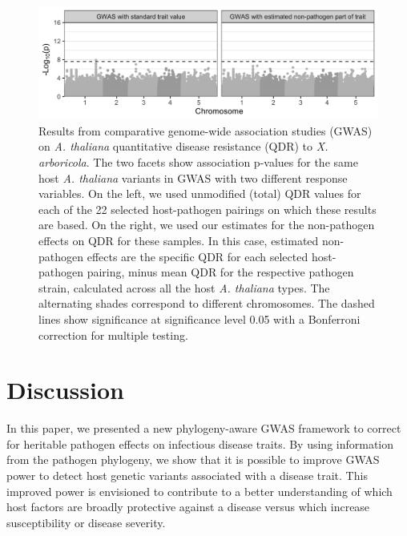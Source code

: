 \documentclass[11pt]{article}
\begin{document}
\begin{linenumbers}
\begin{figure}[H]
\begin{center}
    \includegraphics[width = \linewidth]{fig7_Stadler_MBE-21-1179}
	\caption{Results from comparative genome-wide association studies (GWAS) on \emph{A. thaliana} quantitative disease resistance (QDR) to \emph{X. arboricola}. The two facets show association p-values for the same host \emph{A. thaliana} variants in GWAS with two different response variables. On the left, we used unmodified (total) QDR values for each of the 22 selected host-pathogen pairings on which these results are based. On the right, we used our estimates for the non-pathogen effects on QDR for these samples. In this case, estimated non-pathogen effects are the specific QDR for each selected host-pathogen pairing, minus mean QDR for the respective pathogen strain, calculated across all the host \emph{A. thaliana} types. The alternating shades correspond to different chromosomes. The dashed lines show significance at significance level 0.05 with a Bonferroni correction for multiple testing.}
	\label{fig:gwas-results-qdr}
	\end{center}
\end{figure}

\section*{Discussion}
In this paper, we presented a new phylogeny-aware GWAS framework to correct for heritable pathogen effects on infectious disease traits. By using information from the pathogen phylogeny, we show that it is possible to improve GWAS power to detect host genetic variants associated with a disease trait. This improved power is envisioned to contribute to a better understanding of which host factors are broadly protective against a disease versus which increase susceptibility or disease severity.


\end{linenumbers}
\end{document}

